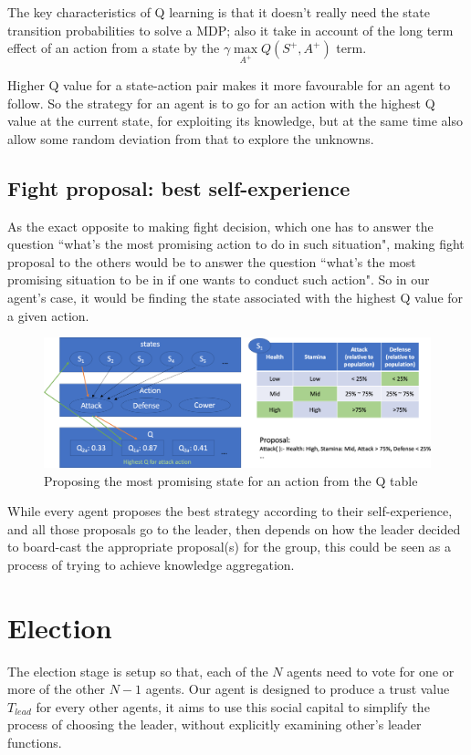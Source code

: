 The key characteristics of Q learning is that it doesn't really need the state transition probabilities to solve a MDP; also it take in account of the long term effect of an action from a state by the $\gamma \max\limits_{A^+} Q(S^+,A^+)$ term.

Higher Q value for a state-action pair makes it more favourable for an agent to follow. So the strategy for an agent is to go for an action with the highest Q value at the current state, for exploiting its knowledge, but at the same time also allow some random deviation from that to explore the unknowns.

\subsection{Fight proposal: best self-experience}
As the exact opposite to making fight decision, which one has to answer the question ``what's the most promising action to do in such situation", making fight proposal to the others would be to answer the question ``what's the most promising situation to be in if one wants to conduct such action". So in our agent's case, it would be finding the state associated with the highest Q value for a given action.

\begin{figure}[!h]
    \centering
    \includegraphics[width=1\textwidth]{008_team_5_agent_design/images/proposal_from_qtable.png}
    \caption{Proposing the most promising state for an action from the Q table}
    \label{fig:proposal_from_qtable}
\end{figure}

While every agent proposes the best strategy according to their self-experience, and all those proposals go to the leader, then depends on how the leader decided to board-cast the appropriate proposal(s) for the group, this could be seen as a process of trying to achieve knowledge aggregation.

\section{Election}
The election stage is setup so that, each of the $N$ agents need to vote for one or more of the other $N-1$ agents. Our agent is designed to produce a trust value $T_{lead}$ for every other agents, it aims to use this social capital to simplify the process of choosing the leader, without explicitly examining other's leader functions.

